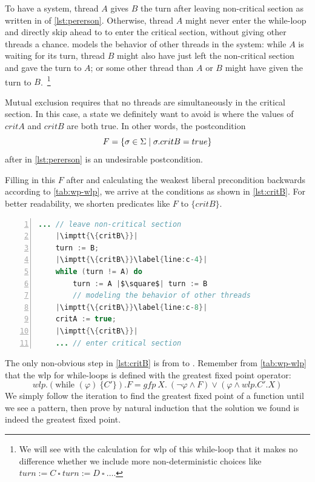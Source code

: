 To have a  system, thread $A$ gives $B$ the turn after leaving non-critical section as written in  of \autoref{lst:pererson}. 
Otherwise, thread $A$ might never enter the while-loop and directly skip ahead to  to enter the critical section, without giving other threads a chance. 
 models the behavior of other threads in the system: while $A$ is waiting for its turn, thread $B$ might also have just left the non-critical section and gave the turn to $A$; or some other thread than $A$ or $B$ might have given the turn to $B$.~\footnote{We will see with the calculation for wlp of this while-loop that it makes no difference whether we include more non-deterministic choices like $turn := C\ \square\ turn := D\ \square\ \dots$.} 

Mutual exclusion requires that no threads are simultaneously in the critical section. 
In this case, a state we definitely want to avoid is where the values of $critA$ and $critB$ are both true. 
In other words, the postcondition 
$$F=\{\sigma\in\S\mid \sigma.critB=true\}$$ 
after  in \autoref{lst:pererson} is an undesirable postcondition.

Filling in this $F$ after  and calculating the weakest liberal precondition backwards according to \autoref{tab:wp-wlp}, we arrive at the conditions as shown in \autoref{lst:critB}. 
For better readability, we shorten predicates like $F$ to $\{critB\}$.

\begin{lstlisting}[caption={Weakest Liberal Precondition w.r.t Postcondition $F=\{\sigma\in\S\mid \sigma.critB=true\}$ }, label={lst:critB}, language=java, numbers=left, stepnumber=1, captionpos=b,escapechar=|,frame=single]
	... // leave non-critical section
	|\imptt{\{critB\}}|
	turn := B;
	|\imptt{\{critB\}}\label{line:c-4}|
	while (turn != A) do 
		turn := A |$\square$| turn := B 
		// modeling the behavior of other threads
	|\imptt{\{critB\}}\label{line:c-8}|
	critA := true;
	|\imptt{\{critB\}}|
	... // enter critical section  
\end{lstlisting}

The only non-obvious step in \autoref{lst:critB} is from  to . 
Remember from \autoref{tab:wp-wlp} that the wlp for while-loops is defined with the greatest fixed point operator: 
\[
	wlp.(\text{while }(\varphi)\ \{C'\}).F = gfp\ X.\ (\neg\varphi\wedge F)\vee(\varphi\wedge wlp.C'.X)
\]
We simply follow the iteration to find the greatest fixed point of a function until we see a pattern, then prove by natural induction that the solution we found is indeed the greatest fixed point. 

